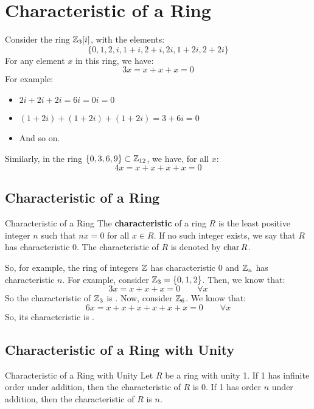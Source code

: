 \documentclass[letterpaper]{article}
\begin{document}
\section{Characteristic of a Ring}
Consider the ring $\mathbb{Z}_{3}[i]$, with the elements:
\[\{0, 1, 2, i, 1 + i, 2 + i, 2i, 1 + 2i, 2 + 2i\}\]
For any element $x$ in this ring, we have: 
\[3x = x + x + x = 0\]
For example:
\begin{itemize}
    \item $2i + 2i + 2i = 6i = 0i = 0$
    \item $(1 + 2i) + (1 + 2i) + (1 + 2i) = 3 + 6i = 0$
    \item And so on.
\end{itemize}
Similarly, in the ring $\{0, 3, 6, 9\} \subset \mathbb{Z}_{12}$, we have, for all $x$: 
\[4x = x + x + x + x = 0\]

\subsection{Characteristic of a Ring}
\begin{definition}{Characteristic of a Ring}{}
    The \textbf{characteristic} of a ring $R$ is the least positive integer $n$ such that $nx = 0$ for all $x \in R$. If no such integer exists, we say that $R$ has characteristic 0. The characteristic of $R$ is denoted by $\operatorname{char}{R}$.    
\end{definition}
So, for example, the ring of integers $\mathbb{Z}$ has characteristic 0 and $\mathbb{Z}_n$ has characteristic $n$. For example, consider $\mathbb{Z}_{3} = \{0, 1, 2\}$. Then, we know that:
\[3x = x + x + x = 0 \qquad \forall x\]
So the characteristic of $\mathbb{Z}_{3}$ is . Now, consider $\mathbb{Z}_{6}$. We know that:
\[6x = x + x + x + x + x + x = 0 \qquad \forall x\]
So, its characteristic is .

\subsection{Characteristic of a Ring with Unity}
\begin{theorem}{Characteristic of a Ring with Unity}{}
    Let $R$ be a ring with unity 1. If 1 has infinite order under addition, then the characteristic of $R$ is 0. If 1 has order $n$ under addition, then the characteristic of $R$ is $n$. 
\end{theorem}
\end{document}
